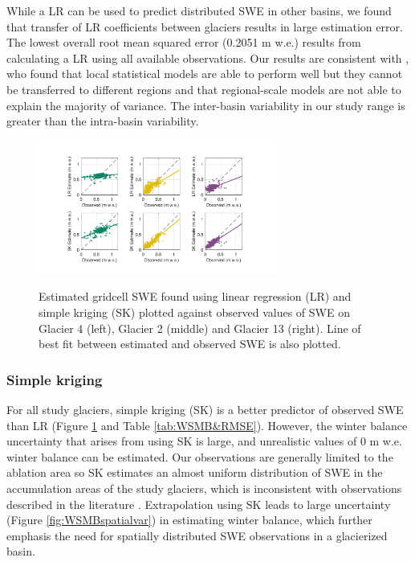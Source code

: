\documentclass[twocolumn, letterpaper]{igs}
\begin{document}
While a LR can be used to predict distributed SWE in other basins, we found that transfer of LR coefficients between glaciers results in large estimation error. The lowest overall root mean squared error (0.2051 m w.e.) results from calculating a LR using all available observations. Our results are consistent with \cite{Grunewald2013}, who found that local statistical models are able to perform well but they cannot be transferred to different regions and that regional-scale models are not able to explain the majority of variance. The inter-basin variability in our study range is greater than the intra-basin variability.

\begin{figure}
	\centering
	\includegraphics[width =0.7\textwidth]{observedVSestimated_S2.pdf}\\
	\caption{Estimated gridcell SWE found using linear regression (LR) and simple kriging (SK) plotted against observed values of SWE on Glacier 4 (left), Glacier 2 (middle) and Glacier 13 (right). Line of best fit between estimated and observed SWE is also plotted.}
	\label{fig:observedVSestimated_S2}
\end{figure}

\subsubsection{Simple kriging}

For all study glaciers, simple kriging (SK) is a better predictor of observed SWE than LR (Figure  \ref{fig:observedVSestimated_S2} and Table \ref{tab:WSMB&RMSE}). However, the winter balance uncertainty that arises from using SK is large, and unrealistic values of 0 m w.e. winter balance can be estimated. Our observations are generally limited to the ablation area so SK estimates an almost uniform distribution of SWE in the accumulation areas of the study glaciers, which is inconsistent with observations described in the literature \citep[e.g.][]{Machguth2006, Grabiec2011}. Extrapolation using SK leads to large uncertainty (Figure \ref{fig:WSMBspatialvar}) in estimating winter balance, which further emphasis the need for spatially distributed SWE observations in a glacierized basin.
\end{document}
